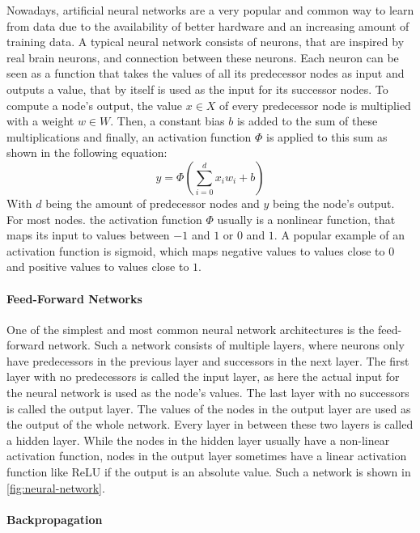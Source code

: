 Nowadays, artificial neural networks are a very popular and common way to learn from data due to the availability of better hardware and an increasing amount of training data.
A typical neural network consists of neurons, that are inspired by real brain neurons, and connection between these neurons.
Each neuron can be seen as a function that takes the values of all its predecessor nodes as input and outputs a value, that by itself is used as the input for its successor nodes.
To compute a node's output, the value $x \in X$ of every predecessor node is multiplied with a weight $w \in W$.
Then, a constant bias $b$ is added to the sum of these multiplications and finally, an activation function $\Phi$ is applied to this sum as shown in the following equation:
\[
	y = \Phi(\sum_{i=0}^{d}x_iw_i + b)
\]
With $d$ being the amount of predecessor nodes and $y$ being the node's output.
For most nodes. the activation function $\Phi$ usually is a nonlinear function, that maps its input to values between $-1$ and $1$ or $0$ and $1$.
A popular example of an activation function is sigmoid, which maps negative values to values close to $0$ and positive values to values close to $1$.
\cite[p.~4--13]{Aggarwal2018}

\paragraph{Feed-Forward Networks}

One of the simplest and most common neural network architectures is the feed-forward network.
Such a network consists of multiple layers, where neurons only have predecessors in the previous layer and successors in the next layer.
The first layer with no predecessors is called the input layer, as here the actual input for the neural network is used as the node's values.
The last layer with no successors is called the output layer.
The values of the nodes in the output layer are used as the output of the whole network.
Every layer in between these two layers is called a hidden layer.
While the nodes in the hidden layer usually have a non-linear activation function, nodes in the output layer sometimes have a linear activation function like ReLU if the output is an absolute value. 
Such a network is shown in \cref{fig:neural-network}.
\cite[p.~17--20]{Aggarwal2018}

\paragraph{Backpropagation}

